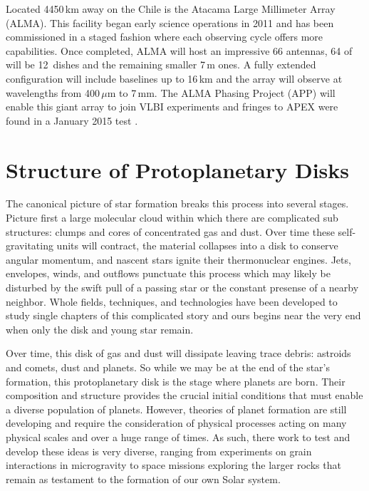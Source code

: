 Located 4450\,km away on the Chile is the Atacama Large Millimeter Array (ALMA).  This facility began early
science operations in 2011 and has been commissioned in a staged fashion where each observing cycle offers more 
capabilities.  Once completed, ALMA will host an impressive 66 antennas, 64 of will be 12\, dishes and
the remaining smaller 7\,m ones.  A fully extended configuration will include baselines up to 16\,km and the 
array will observe at wavelengths from 400\,$\mu$m to 7\,mm.  The ALMA Phasing Project (APP) will enable this
giant array to join VLBI experiments and fringes to APEX were found in a January 2015 test \citep{matthews15}.



\section{Structure of Protoplanetary Disks}

The canonical picture of star formation breaks this process into several stages.  Picture first a large 
molecular cloud within which there are complicated sub structures: clumps and cores of 
concentrated gas and dust.  Over time these self-gravitating units will contract,  the material collapses into 
a disk to conserve angular momentum, and nascent stars ignite their thermonuclear engines.  Jets, envelopes, 
winds, and outflows punctuate this 
process which may likely be disturbed by the swift pull of a passing star or the constant presense of a nearby 
neighbor.  Whole fields, techniques, and technologies have been developed to study single chapters of this 
complicated story and ours begins near the very end when only the disk and young star remain.

Over time, this disk of gas and dust will dissipate leaving trace debris: astroids and comets, dust and planets.
So while we may be at the end of the star's formation, this protoplanetary disk is the stage where planets are
born.  Their composition and structure provides the crucial initial conditions that must enable a diverse 
population of planets.  However, theories of planet formation are still developing and require the consideration 
of physical processes acting on many physical scales and over a huge range of times.  As such, there 
work to test and develop these ideas is very diverse, ranging from experiments on grain interactions in 
microgravity to space missions exploring the larger rocks that remain as testament to the formation of our 
own Solar system.  

